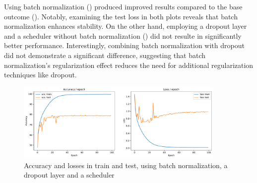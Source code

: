 Using batch normalization () produced improved results compared to the base outcome (). Notably, examining the test loss in both plots reveals that batch normalization enhances stability. On the other hand, employing a dropout layer and a scheduler without batch normalization () did not resulte in significantly better performance. Interestingly, combining batch normalization with dropout did not demonstrate a significant difference, suggesting that batch normalization's regularization effect reduces the need for additional regularization techniques like dropout.





\begin{figure}[H]
    \centering
    \includegraphics*[width=0.9\textwidth]{figs/CNN/batchnorm_with_dropout.pdf}
    \caption{Accuracy and losses in train and test, using batch normalization, a dropout layer and a scheduler}
    \label{fig:batchnorm_with_dropout}
\end{figure}

